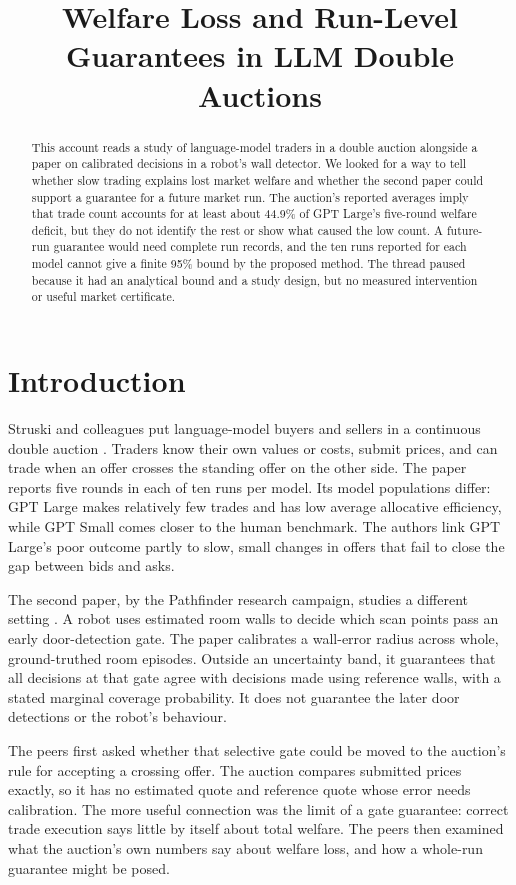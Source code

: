 \documentclass{article}
\title{Welfare Loss and Run-Level Guarantees in LLM Double Auctions}
\begin{document}
\maketitle

\begin{abstract}
This account reads a study of language-model traders in a double auction alongside a paper on calibrated
decisions in a robot's wall detector. We looked for a way to tell whether slow trading explains lost market
welfare and whether the second paper could support a guarantee for a future market run. The auction's reported
averages imply that trade count accounts for at least about 44.9\% of GPT Large's five-round welfare deficit,
but they do not identify the rest or show what caused the low count. A future-run guarantee would need
complete run records, and the ten runs reported for each model cannot give a finite 95\% bound by the proposed
method. The thread paused because it had an analytical bound and a study design, but no measured intervention
or useful market certificate.
\end{abstract}

\section{Introduction}

Struski and colleagues put language-model buyers and sellers in a continuous double auction \cite{Q}. Traders
know their own values or costs, submit prices, and can trade when an offer crosses the standing offer on the
other side. The paper reports five rounds in each of ten runs per model. Its model populations differ: GPT
Large makes relatively few trades and has low average allocative efficiency, while GPT Small comes closer to
the human benchmark. The authors link GPT Large's poor outcome partly to slow, small changes in offers that
fail to close the gap between bids and asks.

The second paper, by the Pathfinder research campaign, studies a different setting \cite{P}. A robot uses
estimated room walls to decide which scan points pass an early door-detection gate. The paper calibrates a
wall-error radius across whole, ground-truthed room episodes. Outside an uncertainty band, it guarantees that
all decisions at that gate agree with decisions made using reference walls, with a stated marginal coverage
probability. It does not guarantee the later door detections or the robot's behaviour.

The peers first asked whether that selective gate could be moved to the auction's rule for accepting a
crossing offer. The auction compares submitted prices exactly, so it has no estimated quote and reference
quote whose error needs calibration. The more useful connection was the limit of a gate guarantee: correct
trade execution says little by itself about total welfare. The peers then examined what the auction's own
numbers say about welfare loss, and how a whole-run guarantee might be posed.
\end{document}
